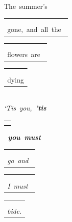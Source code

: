 \documentclass[12pt,a5paper,openany]{memoir}
\begin{document}
The~summer’s~\begin{tabular}[b]{l}
    \textbf{\sffamily\color{red}{D}}\\
    \textbf{\sffamily\color{red}\color{blue}{IV}}\\gone,~and~all~the~\mbox{}\end{tabular}\begin{tabular}[b]{l}
    \small{\sffamily\color{LightRed}{D7}}\\
    \small{\sffamily\color{LightRed}\color{blue}{IV7}}\\flowers~are~\mbox{}\end{tabular}\begin{tabular}[b]{l}
    \textbf{\sffamily\color{red}{G}}\\
    \textbf{\sffamily\color{red}\color{blue}{VIIb}}\\dying\mbox{}\end{tabular}\\
\emph{‘Tis~you,~\textbf{’tis~}}\begin{tabular}[b]{l}
    \textbf{\sffamily\color{red}{D}}\\
    \textbf{\sffamily\color{red}\color{blue}{IV}}\mbox{}\end{tabular}\emph{\textbf{~you~must}~}\begin{tabular}[b]{l}
    \textbf{\sffamily\color{red}{Em}}\\
    \textbf{\sffamily\color{red}\color{blue}{Vm}}\\\emph{go~and~}\mbox{}\end{tabular}\begin{tabular}[b]{l}
    \textbf{\sffamily\color{red}{A7}}\\
    \textbf{\sffamily\color{red}\color{blue}{I7}}\\\emph{I~must~}\mbox{}\end{tabular}\begin{tabular}[b]{l}
    \textbf{\sffamily\color{red}{D}}\\
    \textbf{\sffamily\color{red}\color{blue}{IV}}\\\emph{bide.}\mbox{}\end{tabular}

    \vspace{\parskip}
\end{document}
